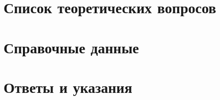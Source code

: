 \documentclass[openright,a5paper,twoside]{book}
\begin{document}










\chapter[Список теоретических вопросов]{Список теоретических вопросов}
\thispagestyle{empty}




\chapter{Справочные данные}
\thispagestyle{empty}


%

\chapter{Ответы и указания}
\thispagestyle{empty}


%

%

%

%

%
%


\renewcommand*{\bibfont}{\footnotesize}
\nocite{*}
\printbibliography[heading=bibnumbered, title={Список литературы}]
\end{document}
